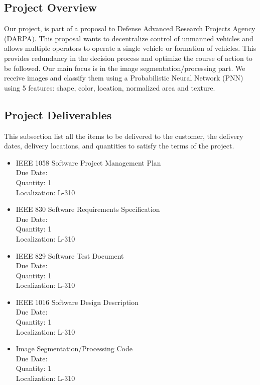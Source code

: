 \documentclass[12pt]{article}
\begin{document}
\subsection{Project Overview}
 Our project, is part of a proposal to Defense Advanced Research Projects Agency (DARPA). This proposal wants to decentralize control of unmanned vehicles and allows multiple operators to operate a single vehicle or formation of vehicles. This provides redundancy in the decision process and optimize the course of action to be followed. Our main focus is in the image segmentation/processing part. We receive images and classify them using a Probabilistic Neural Network (PNN) using 5 features: shape, color, location, normalized area and texture.

\subsection{Project Deliverables}
This subsection list all the items to be delivered to the customer, the delivery dates, delivery locations, and quantities to satisfy the terms of the project.
\begin{itemize}
  \item IEEE 1058 Software Project Management Plan\\
            Due Date: \\
            Quantity: 1\\
            Localization: L-310
  \item IEEE 830 Software Requirements Specification\\
            Due Date: \\
            Quantity: 1\\
            Localization: L-310
  \item IEEE 829 Software Test Document \\
            Due Date: \\
            Quantity: 1\\
            Localization: L-310

  \item IEEE 1016 Software Design Description\\
            Due Date:\\
            Quantity: 1\\
            Localization: L-310
            
  \item Image Segmentation/Processing Code\\
            Due Date:\\
            Quantity: 1\\
            Localization: L-310
\end{itemize}
\end{document}
